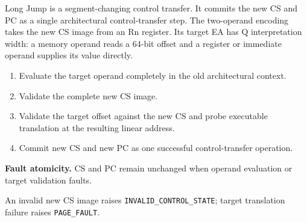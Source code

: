 Long Jump is a segment-changing control transfer. It commits the new CS and PC as a single architectural control-transfer step. The two-operand encoding takes the new CS image from an Rn register. Its target EA has Q interpretation width: a memory operand reads a 64-bit offset and a register or immediate operand supplies its value directly.

\begin{enumerate}
\item Evaluate the target operand completely in the old architectural context.
\item Validate the complete new CS image.
\item Validate the target offset against the new CS and probe executable translation at the resulting linear address.
\item Commit new CS and new PC as one successful control-transfer operation.
\end{enumerate}

\textbf{Fault atomicity.} CS and PC remain unchanged when operand evaluation or target validation faults.

An invalid new CS image raises \texttt{INVALID\_CONTROL\_STATE}; target translation failure raises
\texttt{PAGE\_FAULT}.
